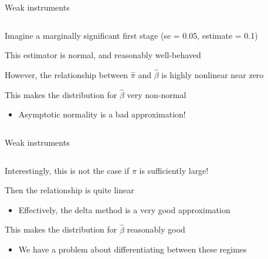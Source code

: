 \documentclass[notes,11pt, aspectratio=169]{beamer}
\newenvironment{wideitemize}{\itemize\addtolength{\itemsep}{10pt}}{\enditemize}
\begin{document}
\begin{frame}{Weak instruments}
  \begin{columns}[T] %
    \begin{column}{0.5\textwidth}
  \begin{wideitemize}
  \item<1-> Imagine a marginally significant first stage (se = 0.05, estimate = 0.1)
  \item<1-> This estimator is normal, and reasonably well-behaved
  \item<2-> However, the relationship between $\hat{\pi}$ and
    $\hat{\beta}$ is highly nonlinear near zero
  \item<3-> This makes the distribution for $\hat{\beta}$ very
    non-normal
    \begin{itemize}
    \item Asymptotic normality is a bad approximation!
    \end{itemize}
  \end{wideitemize}
\end{column}
\begin{column}{0.5\textwidth}
\end{column}
\end{columns}
\end{frame}


\begin{frame}{Weak instruments}
  \begin{columns}[T] %
    \begin{column}{0.5\textwidth}
  \begin{wideitemize}
  \item<1-> Interestingly, this is not the case if $\pi$ is sufficiently large!
  \item<1-> Then the relationship is quite linear
    \begin{itemize}
    \item Effectively, the delta method is a very good approximation
    \end{itemize}
  \item<2-> This makes the distribution for $\hat{\beta}$ reasonably good 
    \begin{itemize}
    \item We have a problem about differentiating between these regimes
    \end{itemize}
  \end{wideitemize}
\end{column}
\begin{column}{0.5\textwidth}
\end{column}
\end{columns}
\end{frame}
\end{document}
